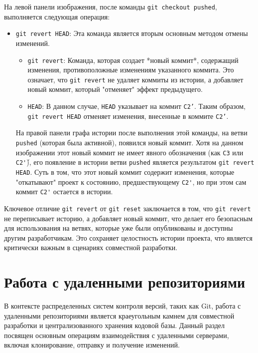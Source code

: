 \label{fig:lgb_reset_revert_continued}

На левой панели изображения, после команды \texttt{git checkout pushed}, выполняется следующая операция:
\begin{itemize}
    \item \texttt{git revert HEAD}: Эта команда является вторым основным методом отмены изменений.
    \begin{itemize}
        \item \texttt{git revert}: Команда, которая создает *новый коммит*, содержащий изменения, противоположные изменениям указанного коммита.
        Это означает, что \texttt{git revert} не удаляет коммиты из истории, а добавляет новый коммит, который "отменяет" эффект предыдущего.
        \item \texttt{HEAD}: В данном случае, \texttt{HEAD} указывает на коммит \texttt{C2'}.
        Таким образом, \texttt{git revert HEAD} отменяет изменения, внесенные в коммите \texttt{C2'}.
    \end{itemize}
    На правой панели графа истории после выполнения этой команды, на ветви \texttt{pushed} (которая была активной), появился новый коммит.
    Хотя на данном изображении этот новый коммит не имеет явного обозначения (как \texttt{C3} или \texttt{C2\'\'}), его появление в истории ветви \texttt{pushed} является результатом \texttt{git revert HEAD}. Суть в том, что этот новый коммит содержит изменения, которые "откатывают" проект к состоянию, предшествующему \texttt{C2\'}, но при этом сам коммит \texttt{C2\'} остается в истории.
\end{itemize}
Ключевое отличие \texttt{git revert} от \texttt{git reset} заключается в том, что \texttt{git revert} не переписывает историю, а добавляет новый коммит, что делает его безопасным для использования на ветвях, которые уже были опубликованы и доступны другим разработчикам.
Это сохраняет целостность истории проекта, что является критически важным в сценариях совместной разработки.


\section{Работа с удаленными репозиториями}\label{sec:lgb-remote-repositories}
В контексте распределенных систем контроля версий, таких как Git, работа с удаленными репозиториями является краеугольным камнем для совместной разработки и централизованного хранения кодовой базы.
Данный раздел посвящен основным операциям взаимодействия с удаленными серверами, включая клонирование, отправку и получение изменений.

